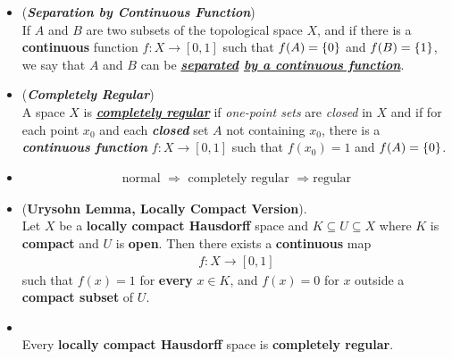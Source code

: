 \documentclass[11pt]{article}
\begin{document}
\begin{itemize}
\item \begin{definition} (\emph{\textbf{Separation by Continuous Function}})\\
If $A$ and $B$ are two subsets of the topological space $X$, and if there is a \textbf{continuous} function $f : X \rightarrow [0, 1]$ such that $f(A) = \left\{0\right\}$ and $f(B) = \left\{1\right\}$, we say that $A$ and $B$ can be \emph{\textbf{\underline{separated} \underline{by a continuous function}}}.
\end{definition}

\item \begin{definition} (\emph{\textbf{Completely Regular}})\\
A space $X$ is \emph{\textbf{\underline{completely regular}}} if \emph{one-point sets} are \emph{closed} in $X$ and if for each point $x_0$ and each \emph{\textbf{closed}} set $A$ not containing $x_0$, there is a \emph{\textbf{continuous function}} $f : X \rightarrow [0, 1]$ such that $f(x_0) = 1$ and $f(A) = \left\{0\right\}$.
\end{definition}

\item \begin{remark}
\begin{align*}
\text{normal } \Rightarrow \text{ completely regular } \Rightarrow \text{regular}
\end{align*}
\end{remark}

\item \begin{theorem}  (\textbf{Urysohn Lemma, Locally Compact Version}). \citep{folland2013real}\\ 
Let $X$ be a \textbf{locally compact Hausdorff} space and $K \subseteq U \subseteq X$ where $K$ is \textbf{compact} and $U$ is \textbf{open}.  Then there exists a \textbf{continuous} map
\begin{align*}
f : X \rightarrow [0, 1]
\end{align*}
such that $f(x) = 1$ for \textbf{every} $x \in K$, and $f(x) = 0$ for $x$ outside a \textbf{compact subset} of $U$.
\end{theorem}

\item \begin{corollary}\citep{folland2013real}\\ 
Every \textbf{locally compact Hausdorff} space is \textbf{completely regular}.
\end{corollary}


\end{itemize}
\end{document}
